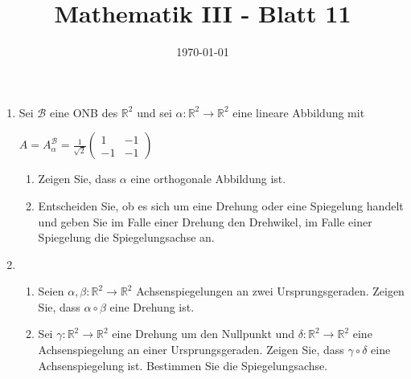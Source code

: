 \documentclass[a4paper]{article}
\author{ }
\title{\vspace{-2cm}Mathematik III - Blatt 11}
\date{\today{}}
\begin{document}
\maketitle

\begin{enumerate}

\item Sei $\mathcal{B}$ eine ONB des $\mathbb{R}^2$ und sei $\alpha: \mathbb{R}^2 \rightarrow \mathbb{R}^2$ eine lineare Abbildung mit 

\begin{center}
$A = A^{\mathcal{B}}_{\alpha} = \frac{1}{\sqrt{2}} \begin{pmatrix} 1& -1 \\ -1 &-1\end{pmatrix}$
\end{center}

\begin{enumerate}[label=(\alph*)]
        \item Zeigen Sie, dass $\alpha$ eine orthogonale Abbildung ist.
        \item Entscheiden Sie, ob es sich um eine Drehung oder eine Spiegelung handelt und geben Sie im Falle einer Drehung den Drehwikel, im Falle einer Spiegelung die Spiegelungsachse an.
\end{enumerate}
\item \begin{enumerate}[label=(\alph*)]
			\item Seien $\alpha,\beta : \mathbb{R}^2 \rightarrow \mathbb{R}^2$ Achsenspiegelungen an zwei Ursprungsgeraden. Zeigen Sie, dass $\alpha \circ \beta$ eine Drehung ist.
			\item Sei $\gamma: \mathbb{R}^2 \rightarrow \mathbb{R}^2$ eine Drehung um den Nullpunkt und $\delta: \mathbb{R}^2 \rightarrow \mathbb{R}^2$ eine Achsenspiegelung an einer Ursprungsgeraden. Zeigen Sie, dass $\gamma \circ \delta$ eine Achsenspiegelung ist. Bestimmen Sie die Spiegelungsachse.

		\end{enumerate}



\end{enumerate}
\end{document}
